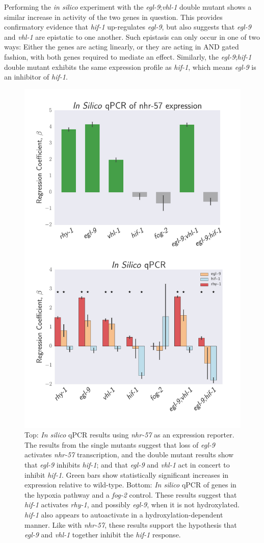 \documentclass[9pt,twocolumn,twoside]{pnas-new}
\newcommand{\egl}{\emph{egl-9}}
\newcommand{\rhy}{\emph{rhy-1}}
\newcommand{\vhl}{\emph{vhl-1}}
\newcommand{\hif}{\emph{hif-1}}
\newcommand{\fog}{\emph{fog-2}}
\newcommand{\nhr}{\emph{nhr-57}}
\begin{document}
Performing the \emph{in silico} experiment with the \egl{};\vhl{} double mutant shows a similar increase in activity of the two genes in question.
This provides confirmatory evidence that \hif{} up-regulates \egl{}, but also suggests that \egl{} and \vhl{} are epistatic to one another. Such epistasis can only occur in one of two ways: Either the genes are acting linearly, or they are acting in AND gated fashion, with both genes required to mediate an effect. Similarly, the \egl{};\hif{} double mutant exhibits the same expression profile as \hif{}, which means \egl{} is an inhibitor of \hif{}.
\begin{figure}[tbhp]
\centering
\includegraphics[width=.72\linewidth]{figs/insilico_qpcr.pdf}
\caption{Top: \emph{In silico} qPCR results using \nhr{} as an expression reporter. The results from the single mutants suggest that loss of \egl{} activates \nhr{} transcription, and the double mutant results show that \egl{} inhibits \hif{}; and that \egl{} and \vhl{} act in concert to inhibit \hif{}. Green bars show statistically significant increases in expression relative to wild-type. Bottom: \emph{In silico} qPCR of genes in the hypoxia pathway and a \fog{} control. These results suggest that \hif{} activates \rhy{}, and possibly \egl{}, when it is not hydroxylated. \hif{} also appears to autoactivate in a hydroxylation-dependent manner. Like with \nhr{}, these results support the hypothesis that \egl{} and \vhl{} together inhibit the \hif{} response.}
\label{fig:qpcr}
\end{figure}
\end{document}
